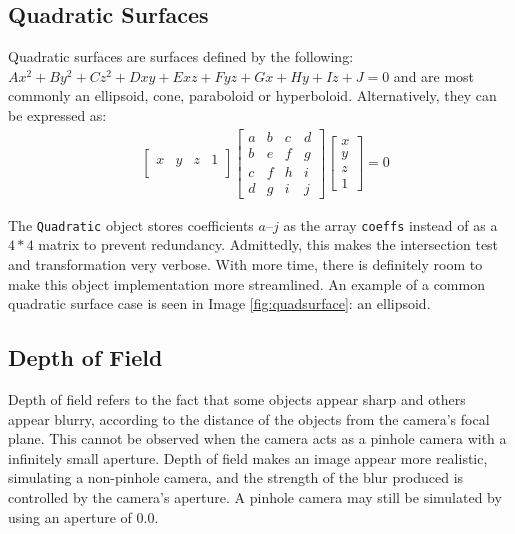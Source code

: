 \documentclass[a4paper]{article}
\begin{document}
\subsection{Quadratic Surfaces}
Quadratic surfaces are surfaces defined by the following: $ Ax^{2}+By^{2}+Cz^{2}+Dxy+Exz+Fyz+Gx+Hy+Iz+J=0 $ and are most commonly an ellipsoid, cone, paraboloid or hyperboloid. Alternatively, they can be expressed as:
\begin{align*}
    &
    \begin{bmatrix}
        x & y & z & 1 \\
    \end{bmatrix}
    \begin{bmatrix}
        a & b & c & d \\
        b & e & f & g \\
        c & f & h & i \\
        d & g & i & j 
    \end{bmatrix}
    \begin{bmatrix}
        x \\
        y \\
        z \\
        1
    \end{bmatrix} = 0
\end{align*}

The \texttt{Quadratic} object stores coefficients $a$--$j$ as the array \texttt{coeffs} instead of as a $4*4$ matrix to prevent redundancy. Admittedly, this makes the intersection test and transformation very verbose. With more time, there is definitely room to make this object implementation more streamlined. An example of a common quadratic surface case is seen in Image \ref{fig:quadsurface}: an ellipsoid.

\subsection{Depth of Field}\label{ss:depthoffield}
Depth of field refers to the fact that some objects appear sharp and others appear blurry, according to the distance of the objects from the camera's focal plane. This cannot be observed when the camera acts as a pinhole camera with a infinitely small aperture. Depth of field makes an image appear more realistic, simulating a non-pinhole camera, and the strength of the blur produced is controlled by the camera's aperture. A pinhole camera may still be simulated by using an aperture of $0.0$.
\end{document}
